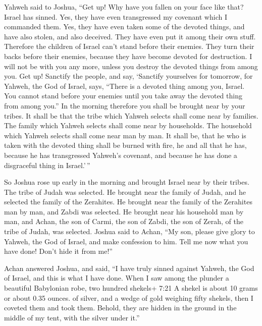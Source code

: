  Yahweh said to Joshua, ``Get up! Why have you fallen on
your face like that?  Israel has sinned. Yes, they have
even transgressed my covenant which I commanded them. Yes, they have
even taken some of the devoted things, and have also stolen, and also
deceived. They have even put it among their own stuff. 
Therefore the children of Israel can't stand before their enemies. They
turn their backs before their enemies, because they have become devoted
for destruction. I will not be with you any more, unless you destroy the
devoted things from among you.  Get up! Sanctify the
people, and say, `Sanctify yourselves for tomorrow, for Yahweh, the God
of Israel, says, ``There is a devoted thing among you, Israel. You
cannot stand before your enemies until you take away the devoted thing
from among you.''  In the morning therefore you shall be
brought near by your tribes. It shall be that the tribe which Yahweh
selects shall come near by families. The family which Yahweh selects
shall come near by households. The household which Yahweh selects shall
come near man by man.  It shall be, that he who is taken
with the devoted thing shall be burned with fire, he and all that he
has, because he has transgressed Yahweh's covenant, and because he has
done a disgraceful thing in Israel.'\,''

 So Joshua rose up early in the morning and brought Israel
near by their tribes. The tribe of Judah was selected.  He
brought near the family of Judah, and he selected the family of the
Zerahites. He brought near the family of the Zerahites man by man, and
Zabdi was selected.  He brought near his household man by
man, and Achan, the son of Carmi, the son of Zabdi, the son of Zerah, of
the tribe of Judah, was selected.  Joshua said to Achan,
``My son, please give glory to Yahweh, the God of Israel, and make
confession to him. Tell me now what you have done! Don't hide it from
me!''

 Achan answered Joshua, and said, ``I have truly sinned
against Yahweh, the God of Israel, and this is what I have done.
 When I saw among the plunder a beautiful Babylonian robe,
two hundred shekels+ 7:21 A shekel is about 10 grams or about 0.35
ounces. of silver, and a wedge of gold weighing fifty shekels, then I
coveted them and took them. Behold, they are hidden in the ground in the
middle of my tent, with the silver under it.''

